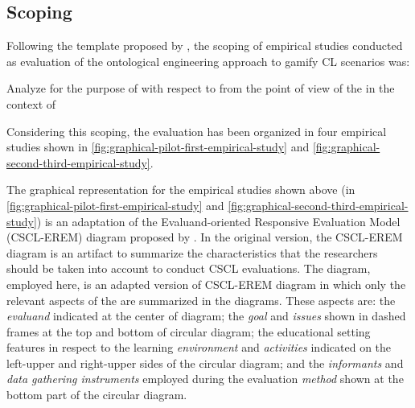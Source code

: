 \subsection{Scoping}
\label{subsec:scoping}

Following the template proposed by , the scoping of empirical studies conducted as evaluation of the ontological engineering approach to gamify CL scenarios was:

Analyze  for the purpose of  with respect to  from the point of view of the  in the context of 

Considering this scoping, the evaluation has been organized in four empirical studies shown in \autoref{fig:graphical-pilot-first-empirical-study} and \autoref{fig:graphical-second-third-empirical-study}.

The graphical representation for the empirical studies shown above (in \autoref{fig:graphical-pilot-first-empirical-study} and \autoref{fig:graphical-second-third-empirical-study}) is an adaptation of the Evaluand-oriented Responsive Evaluation Model (CSCL-EREM) diagram proposed by .
In the original version, the CSCL-EREM diagram is an artifact to summarize the characteristics that the researchers should be taken into account to conduct CSCL evaluations.
The diagram, employed here, is an adapted version of CSCL-EREM diagram in which only the relevant aspects of the  are summarized in the diagrams. These aspects are: the \emph{evaluand} indicated at the center of diagram;
the \emph{goal} and \emph{issues} shown in dashed frames at the top and bottom of circular diagram;
the educational setting features in respect to the learning \emph{environment} and \emph{activities} indicated on the left-upper and right-upper sides of the circular diagram; and
the \emph{informants} and \emph{data gathering instruments} employed during the evaluation \emph{method} shown at the bottom part of the circular diagram.

